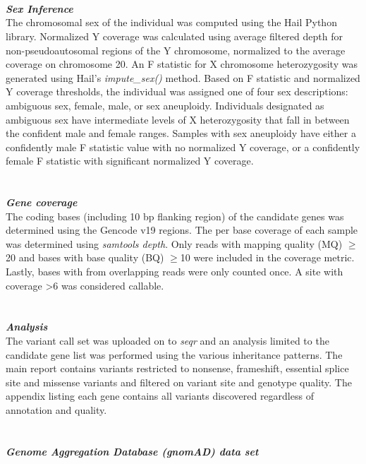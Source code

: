 \\ \\ \\
{\large \textbf{\textit{Sex Inference}}}
\\
The chromosomal sex of the individual was computed using the Hail Python library. Normalized Y coverage was calculated using average filtered depth for non-pseudoautosomal regions of the Y chromosome, normalized to the average coverage on chromosome 20. An F statistic for X chromosome heterozygosity was generated using Hail's \textit{impute\_sex()} method. Based on F statistic and normalized Y coverage thresholds, the individual was assigned one of four sex descriptions: ambiguous sex, female, male, or sex aneuploidy. Individuals designated as ambiguous sex have intermediate levels of X heterozygosity that fall in between the confident male and female ranges. Samples with sex aneuploidy have either a confidently male F statistic value with no normalized Y coverage, or a confidently female F statistic with significant normalized Y coverage. 
\\ \\ \\
{\large \textbf{\textit{Gene coverage}}}
\\
The coding bases (including 10 bp flanking region) of the candidate genes was determined using the Gencode v19 regions. The per base coverage of each
sample was determined using \textit{samtools depth}. Only reads with mapping quality (MQ) $\geq$20 and bases with base quality (BQ) $\geq$10
were included in the coverage metric. Lastly, bases with from overlapping reads were only counted once. A site with coverage \textgreater6 was considered
callable.  
\\ \\ \\
{\large \textbf{\textit{Analysis}}}
\\
The variant call set was uploaded on to \textit{seqr} and an analysis limited to the candidate gene list was performed using the various 
inheritance patterns. The main report contains variants restricted to nonsense, frameshift, essential splice site and missense variants and filtered on variant site and genotype quality. The appendix listing each gene contains all variants discovered regardless of annotation and quality.
\\ \\ \\
{\large \textbf{\textit{Genome Aggregation Database (gnomAD) data set}}}
\\
